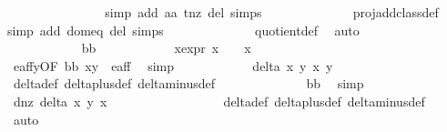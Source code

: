 \begin{isabellebody}
\ \ \ \ \ \ \ \ \ \ \ \ \isamarkupfalse%
\ {}\ \isamarkupfalse%
{\isacharparenleft}simp\ add{\isacharcolon}\ aa\ t{\isacharunderscore}nz\ del{\isacharcolon}\ {\isasymtau}{\isachardot}simps{\isacharparenright}\isanewline
\ \ \ \ \ \ \ \ \ \ \ \ \isamarkupfalse%
\ proj{\isacharunderscore}add{\isacharunderscore}class{\isacharunderscore}def\ \isamarkupfalse%
{\isacharparenleft}simp\ add{\isacharcolon}\ dom{\isacharunderscore}eq\ del{\isacharcolon}\ {\isasymtau}{\isachardot}simps{\isacharparenright}\isanewline
\ \ \ \ \ \ \ \ \ \ \ \ \isamarkupfalse%
\ quotient{\isacharunderscore}def\ \isamarkupfalse%
\ auto\isanewline
\ \ \ \ \ \ \ \ \isamarkupfalse%
\isanewline
\ \ \ \ \ \ \ \ \ \ \isamarkupfalse%
\ bb\isanewline
\ \ \ \ \ \ \ \ \ \ \isamarkupfalse%
\ x{\isacharunderscore}expr{\isacharcolon}\ {\isachardoublequoteopen}x{\isacharprime}\ {\isacharequal}\ {}\ {\isasymor}\ x{\isacharprime}\ {\isacharequal}\ {\isacharminus}{}{\isachardoublequoteclose}\isanewline
\ \ \ \ \ \ \ \ \ \ \ \ \isamarkupfalse%
\ e{\isacharunderscore}aff{\isacharunderscore}y{}{\isacharbrackleft}OF\ bb\ {\isacartoucheopen}{\isacharparenleft}x{\isacharprime}{\isacharcomma}y{\isacharprime}{\isacharparenright}\ {\isasymin}\ e{\isacharunderscore}aff{\isacartoucheclose}{\isacharbrackright}\ \isamarkupfalse%
\ simp\isanewline
\ \ \ \ \ \ \ \ \ \ \isamarkupfalse%
\ {\isachardoublequoteopen}delta\ x\ y\ x{\isacharprime}\ y{\isacharprime}\ {\isasymnoteq}\ {}{\isachardoublequoteclose}\ \isanewline
\ \ \ \ \ \ \ \ \ \ \ \ \isamarkupfalse%
\ delta{\isacharunderscore}def\ delta{\isacharunderscore}plus{\isacharunderscore}def\ delta{\isacharunderscore}minus{\isacharunderscore}def\isanewline
\ \ \ \ \ \ \ \ \ \ \ \ \isamarkupfalse%
\ bb\ \isamarkupfalse%
\ simp\isanewline
\ \ \ \ \ \ \ \ \ \ \isamarkupfalse%
\ d{\isacharunderscore}{}{\isacharunderscore}nz{\isacharcolon}\ {\isachardoublequoteopen}delta\ x\ y\ x{\isacharprime}\ {}\ {\isasymnoteq}\ {}{\isachardoublequoteclose}\ \isanewline
\ \ \ \ \ \ \ \ \ \ \ \ \isamarkupfalse%
\ delta{\isacharunderscore}def\ delta{\isacharunderscore}plus{\isacharunderscore}def\ delta{\isacharunderscore}minus{\isacharunderscore}def\ \isamarkupfalse%
\ auto\isanewline

\end{isabellebody}
